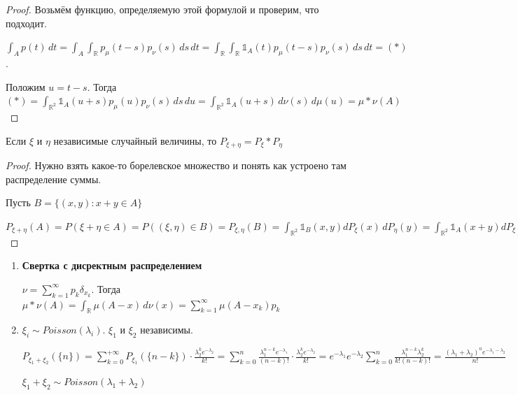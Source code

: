 \begin{proof}
    Возьмём функцию, определяемую этой формулой и проверим, что подходит.

    $\int_A p(t) \, dt = \int_A \int_{\mathbb{R}} p_{\mu} (t - s) p_{\nu} (s) \, ds \, dt = \int_{\mathbb{R}}
    \int_{\mathbb{R}} \mathds{1}_A (t) p_{\mu} (t - s) p_{\nu} (s) \, ds \, dt = (*)$.

    Положим $u = t - s$. Тогда $(*) = \int_{\mathbb{R}^2} \mathds{1}_{A} (u + s) p_{\mu} (u) p_{\nu} (s) \, ds \, du = 
    \int_{\mathbb{R}^2} \mathds{1}_A (u + s) \, d\nu (s) \, d \mu (u) = \mu * \nu (A)$
\end{proof}

\begin{theorem}
    Если $\xi$ и $\eta$ независимые случайный величины, то $P_{\xi + \eta} = P_{\xi} * P_{\eta}$
\end{theorem}

\begin{proof}
    Нужно взять какое-то борелевское множество и понять как устроено там распределение суммы.

    Пусть $B = \{ (x, y) : x + y \in A \}$

    $P_{\xi + \eta} (A) = P(\xi + \eta \in A) = P((\xi, \eta) \in B) = P_{\xi, \eta} (B) = 
    \int_{\mathbb{R}^2} \mathds{1}_B (x, y) d P_{\xi} (x) \, dP_{\eta} (y) =
    \int_{\mathbb{R}^2} \mathds{1}_A (x + y) d P_{\xi} (x) \, dP_{\eta} (y) = P_{\xi} * P_{\eta} (A)$
\end{proof}

\begin{example}
    \begin{enumerate}
        \item {
            \textbf{Свертка с дисректным распределением}

            $\nu = \sum_{k = 1}^{\infty} p_k \delta_{x_k}$. Тогда $\mu * \nu (A) = \int_{\mathbb{R}} \mu (A - x) \, d\nu (x) = 
            \sum_{k = 1}^{\infty} \mu (A - x_k) p_k$
        }
        \item {
            $\xi_i \sim Poisson(\lambda_i)$. $\xi_1$ и $\xi_2$ независимы.

            $P_{\xi_1 + \xi_2} (\{ n \}) = \sum_{k = 0}^{+\infty} P_{\xi_1} (\{ n  - k \}) \cdot 
            \frac{\lambda_2^k e^{-\lambda_2}}{k!} = \sum_{k = 0}^{n} \frac{\lambda_1^{n - k} e^{-\lambda_1}}{(n - k)!} \cdot 
            \frac{\lambda_2^k e^{-\lambda_2}}{k!} = e^{-\lambda_1} e^{-\lambda_2} \sum_{k = 0}^n \frac{\lambda_1^{n - k} \lambda_2^k}{k! (n - k)!} =
            \frac{(\lambda_1 + \lambda_2)^n e^{-\lambda_1 - \lambda_2}}{n!}$

            $\xi_1 + \xi_2 \sim Poisson(\lambda_1 + \lambda_2)$
        }
    \end{enumerate}
\end{example}



